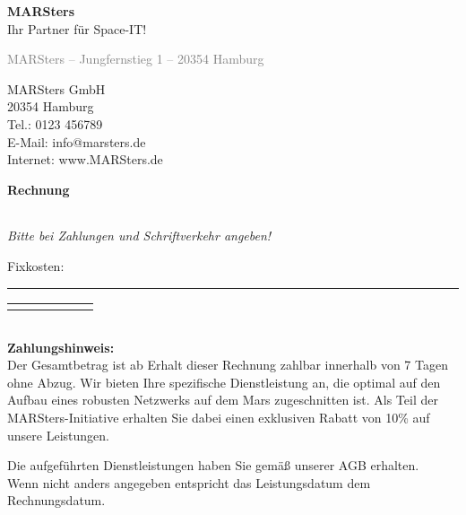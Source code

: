 \documentclass[12pt,a4paper]{article}
\begin{document}
\noindent
\raggedleft
\Huge\textbf{MARSters} \\[0.3em]
\large Ihr Partner für Space-IT! \\
\vspace{2em}
\begin{minipage}[t]{0.5\textwidth}
{\small \textcolor{gray}{MARSters – Jungfernstieg 1 – 20354 Hamburg}} \\[1em]

\end{minipage}
\hfill
\begin{minipage}[t]{0.45\textwidth}
\raggedleft
\vspace{1em}
MARSters GmbH \\
20354 Hamburg \\
Tel.: 0123 456789 \\
E-Mail: info@marsters.de \\
Internet: www.MARSters.de
\end{minipage}

\vspace{1.8em}

\textbf{\LARGE Rechnung}

\vspace{1em}
\begin{tabularx}{\textwidth}{@{}l X r@{}}

\end{tabularx}

\small\textit{Bitte bei Zahlungen und Schriftverkehr angeben!}

\vspace{1em}
Fixkosten:
\rule{\textwidth}{0.5pt}

\renewcommand{\arraystretch}{1.4}
\begin{tabularx}{\textwidth}{|c|X|c|r|c|r|}
\hline
\rowcolor{gray!30}


\end{tabularx}
\vspace{8.5em}
\renewcommand{\arraystretch}{1.4}



\noindent
\begin{minipage}[t]{0.48\textwidth}
\renewcommand{\arraystretch}{1.3}
\begin{tabularx}{\linewidth}{@{}X r@{}}

\end{tabularx}
\end{minipage}
\begin{minipage}[t]{\textwidth}
\small
\textbf{Zahlungshinweis:} \\
Der Gesamtbetrag ist ab Erhalt dieser Rechnung
zahlbar innerhalb von 7 Tagen ohne Abzug.
Wir bieten Ihre spezifische Dienstleistung an, die optimal auf den Aufbau eines robusten Netzwerks auf dem Mars zugeschnitten ist. 
Als Teil der MARSters-Initiative erhalten Sie dabei einen exklusiven Rabatt von 10\% auf unsere Leistungen.
\end{minipage}
\hfill


\vspace{1.5em}
\footnotesize
Die aufgeführten Dienstleistungen haben Sie gemäß unserer AGB erhalten.\\
Wenn nicht anders angegeben entspricht das Leistungsdatum dem Rechnungsdatum.
\end{document}

